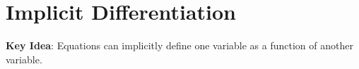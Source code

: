 \documentclass[main]{subfiles}
\begin{document}
\section{Implicit Differentiation} \label{ws1-4}







\textbf{Key Idea}: Equations can implicitly define one variable as a function of another variable.
\end{document}
